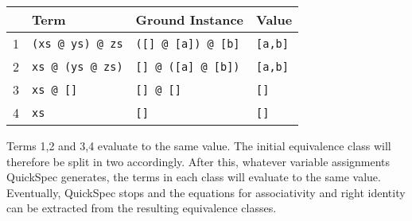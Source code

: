 \begin{tabularx}{\textwidth}{l  X  X  X}
\\
 & Term & Ground Instance & Value \\
 \hline
1 \quad &\texttt{(xs @ ys) @ zs} & \texttt{([] @ [a]) @ [b]} & \texttt{[a,b]} \\
2 \quad&\texttt{xs @ (ys @ zs)} &\texttt{[] @ ([a] @ [b])} & \texttt{[a,b]}\\
3 \quad&\texttt{xs @ []} & \texttt{[] @ []} & \texttt{[]} \\
4 \quad &\texttt{xs} &\texttt{[]} & \texttt{[]} \\
\end{tabularx}
Terms 1,2  and 3,4 evaluate to the same value. The initial equivalence class will therefore be split in two accordingly.
After this, whatever variable assignments QuickSpec generates, the
terms in each class will evaluate to the same value. Eventually, QuickSpec stops and the equations for
associativity and right identity can be extracted from the resulting equivalence classes.

